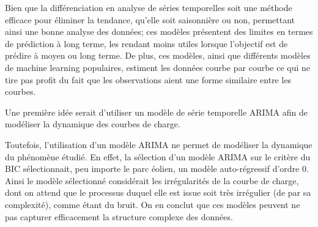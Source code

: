 Bien que la différenciation en analyse de séries temporelles soit une méthode efficace pour éliminer la tendance, qu'elle soit saisonnière ou non, permettant ainsi une bonne analyse des données; ces modèles présentent des limites en termes de prédiction à long terme, les rendant moins utiles lorsque l'objectif est de prédire à moyen ou long terme. De plus, ces modèles, ainsi que différents modèles de machine learning populaires, estiment les données courbe par courbe ce qui ne tire pas profit du fait que les observations aient une forme similaire entre les courbes.

\smallskip

Une première idée serait d'utiliser un modèle de série temporelle ARIMA afin de modéliser la dynamique des courbes de charge.





Toutefois, l'utilisation d'un modèle ARIMA ne permet de modéliser la dynamique du phénomène étudié. En effet, la sélection d'un modèle ARIMA sur le critère du BIC sélectionnait, peu importe le parc éolien, un modèle auto-régressif d'ordre 0. Ainsi le modèle sélectionné considérait les irrégularités de la courbe de charge, dont on attend que le processus duquel elle est issue soit très irrégulier (de par sa complexité), comme étant du bruit. On en conclut que ces modèles peuvent ne pas capturer efficacement la structure complexe des données.